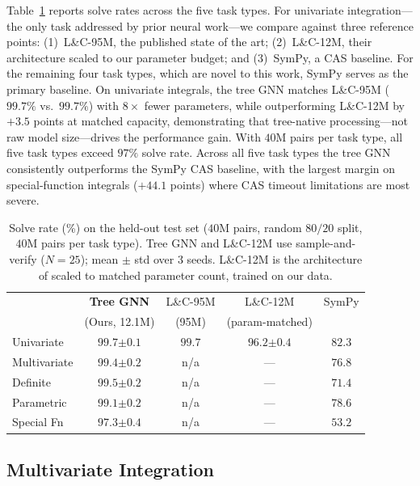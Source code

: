 \documentclass{article}
\begin{document}
Table~\ref{tab:main} reports solve rates across the five task types.
For univariate integration---the only task addressed by prior neural
work---we compare against three reference points:
(1)~L\&C-95M, the published state of the art;
(2)~L\&C-12M, their architecture scaled to our parameter budget; and
(3)~SymPy, a CAS baseline. For the remaining four task types, which
are novel to this work, SymPy serves as the primary baseline.
On univariate integrals, the tree GNN matches L\&C-95M ($99.7\%$
vs.\ $99.7\%$) with $8\times$ fewer parameters,
while outperforming L\&C-12M by $+3.5$ points at matched capacity,
demonstrating that tree-native processing---not raw model
size---drives the performance gain. With $40$M pairs per task type,
all five task types exceed $97\%$ solve rate. Across all five task
types the tree GNN consistently outperforms the SymPy CAS baseline,
with the largest margin on special-function integrals ($+44.1$ points)
where CAS timeout limitations are most severe.

\begin{table}[t]
	\centering
	\caption{Solve rate (\%) on the held-out test set ($40$M pairs, random
		$80/20$ split, $40$M pairs per task type). Tree GNN and L\&C-12M
		use sample-and-verify ($N\!=\!25$); mean $\pm$ std over 3 seeds.
		L\&C-12M is the architecture of \citet{lample2020deep} scaled to
		matched parameter count, trained on our data.}
	\label{tab:main}
	\small
	\begin{tabular}{lcccc}
		\toprule
		             & \textbf{Tree GNN} & L\&C-95M     & L\&C-12M   & SymPy \\
		             & (Ours, 12.1M) & (95M)  & (param-matched) &  \\
		\midrule
		Univariate   & $\mathbf{99.7}{\scriptstyle\pm0.1}$ & $99.7$ & $96.2{\scriptstyle\pm0.4}$ & $82.3$ \\
		Multivariate & $\mathbf{99.4}{\scriptstyle\pm0.2}$ & n/a      & ---      & $76.8$ \\
		Definite     & $\mathbf{99.5}{\scriptstyle\pm0.2}$ & n/a      & ---      & $71.4$ \\
		Parametric   & $\mathbf{99.1}{\scriptstyle\pm0.2}$ & n/a      & ---      & $78.6$ \\
		Special Fn   & $\mathbf{97.3}{\scriptstyle\pm0.4}$ & n/a      & ---      & $53.2$ \\
		\bottomrule
	\end{tabular}
\end{table}


\subsection{Multivariate Integration}
\end{document}
